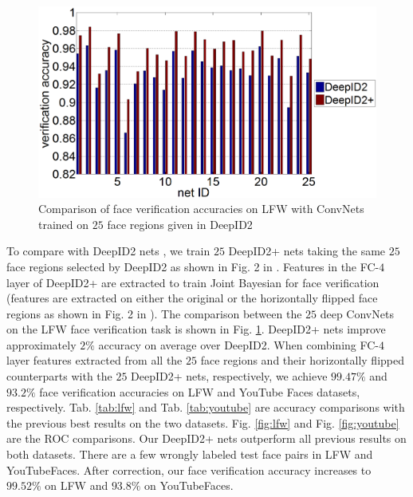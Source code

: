 \documentclass[10pt,twocolumn,letterpaper]{article}
\begin{document}
\begin{figure}[t]
\begin{center}
\includegraphics[width=1.0\linewidth]{picture/21.png}
\end{center}
\vspace{-0.15in}
\caption{Comparison of face verification accuracies on LFW with ConvNets trained on $25$ face regions given in DeepID2 \cite{sun2014b}}
\label{fig:net25_noflip}
\vspace{-0.1in}
\end{figure}

To compare with DeepID2 nets \cite{sun2014b}, we train $25$ DeepID2+ nets taking the same $25$ face regions selected by DeepID2 as shown in Fig. 2 in \cite{sun2014b}. Features in the FC-$4$ layer of DeepID2+ are extracted to train Joint Bayesian for face verification (features are extracted on either the original or the horizontally flipped face regions as shown in Fig. 2 in \cite{sun2014b}). The comparison between the $25$ deep ConvNets on the LFW face verification task is shown in Fig. \ref{fig:net25_noflip}. DeepID2+ nets improve approximately $2\%$ accuracy on average over DeepID2. When combining FC-$4$ layer features extracted from all the $25$ face regions and their horizontally flipped counterparts with the $25$ DeepID2+ nets, respectively, we achieve $\bm{99.47\%}$ and $\bm{93.2\%}$ face verification accuracies on LFW and YouTube Faces datasets, respectively. Tab. \ref{tab:lfw} and Tab. \ref{tab:youtube} are accuracy comparisons with the previous best results on the two datasets. Fig. \ref{fig:lfw} and Fig. \ref{fig:youtube} are the  ROC  comparisons. Our DeepID2+ nets outperform all previous results on both datasets. There are a few wrongly labeled test face pairs in LFW and YouTubeFaces. After correction, our face verification accuracy  increases  to $99.52\%$ on LFW and $93.8\%$ on YouTubeFaces.
\end{document}
